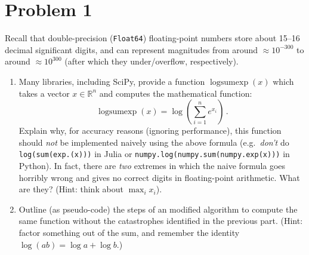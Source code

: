 \documentclass[12pt]{article}
\newcommand{\R}{{\mathbb R}}
\begin{document}

\newpage
\section*{Problem 1}

Recall that double-precision (\texttt{Float64}) floating-point numbers store about 15--16 decimal significant digits, and can represent magnitudes from around $\approx 10^{-300}$ to around $\approx 10^{300}$ (after which they under/overflow, respectively).

\begin{enumerate} \item Many libraries, including SciPy, provide a function $\operatorname{logsumexp}(x)$ which takes a vector $x \in \R^n$ and computes the mathematical function:
$$
\operatorname{logsumexp}(x) = \log\left(\sum_{i=1}^n e^{x_i} \right) \, .
$$
Explain why, for accuracy reasons (ignoring performance), this function should \emph{not} be implemented naively using the above formula (e.g.~\emph{don't} do \texttt{log(sum(exp.(x)))} in Julia or \texttt{numpy.log(numpy.sum(numpy.exp(x)))} in Python).  In fact, there are \emph{two} extremes in which the naive formula goes horribly wrong and gives no correct digits in floating-point arithmetic.  What are they?  (Hint: think about $\max_i x_i$).
\item Outline (as pseudo-code) the steps of an modified algorithm to compute the same function without the catastrophes identified in the previous part.  (Hint: factor something out of the sum, and remember the identity $\log(ab) = \log a+\log b$.)
\end{enumerate}
\end{document}
